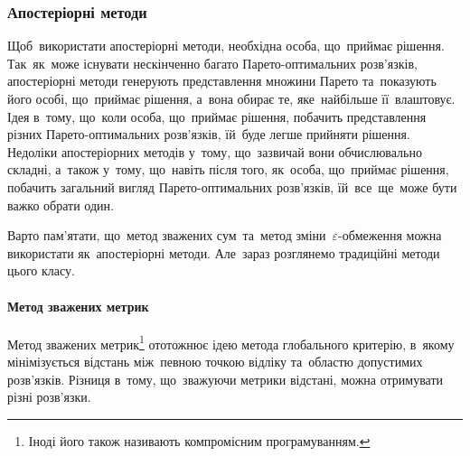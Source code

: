\documentclass[
  a4paper,
  oneside,
  BCOR = 10mm,
  DIV = 12,
  12pt,
  headings = normal,
]{scrartcl}
\begin{document}
    \subsubsection{Апостеріорні методи}
      Щоб~використати апостеріорні методи, необхідна особа, що~приймає рішення. Так~як~може існувати нескінченно багато Парето-оптимальних розв'язків, апостеріорні методи генерують представлення множини Парето та~показують його особі, що~приймає рішення, а~вона обирає те, яке~найбільше її~влаштовує. Ідея в~тому, що~коли особа, що~приймає рішення, побачить представлення різних Парето-оптимальних розв'язків, їй~буде легше прийняти рішення. Недоліки апостеріорних методів у~тому, що~зазвичай вони обчислювально складні, а~також у~тому, що~навіть після того, як~особа, що~приймає рішення, побачить загальний вигляд Парето-оптимальних розв'язків, їй~все~ще~може бути важко обрати один.

      Варто пам'ятати, що~метод зважених сум~та~метод зміни~$\varepsilon$-обмеження можна використати як~апостеріорні методи. Але~зараз розглянемо традиційні методи цього класу.

      \paragraph{Метод зважених метрик}
        Метод зважених метрик\footnote{Іноді його також називають компромісним програмуванням.} ототожнює ідею метода глобального критерію, в~якому мінімізується відстань між~певною точкою відліку та~областю допустимих розв'язків. Різниця в~тому, що~зважуючи метрики відстані, можна отримувати різні розв'язки.
\end{document}
